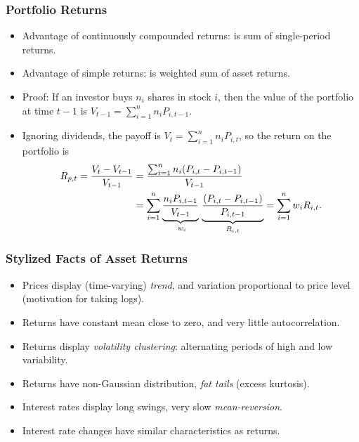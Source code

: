 \begin{frame}
\frametitle{Portfolio Returns}

\begin{itemize}
\item  Advantage of continuously compounded returns: 
is sum of single-period returns.%
\item Advantage of simple returns:  is weighted sum of
asset returns.
\item Proof: If an investor buys $n_{i}$ shares in stock $i$, then the value of the
portfolio at time $t-1$ is $V_{t-1}=\sum_{i=1}^{n}n_{i}P_{i,t-1}$.

\item Ignoring dividends, the payoff is $V_{t}=\sum_{i=1}^{n}n_{i}P_{i,t}$, so the return
on the portfolio is%
\begin{align*}
R_{p,t}=\frac{V_{t}-V_{t-1}}{V_{t-1}} &=\frac{\sum_{i=1}^{n}n_{i}(P_{i,t}-P_{i,t-1})}{V_{t-1}} \\
&=\sum_{i=1}^{n}\underset{w_{i}}{\underbrace{\frac{n_{i}P_{i,t-1}}{%
V_{t-1}}}\ }\underset{R_{i,t}}{\underbrace{\frac{(P_{i,t}-P_{i,t-1})}{P_{i,t-1}}}}
=\sum_{i=1}^{n}w_{i}R_{i,t}.
\end{align*}


\end{itemize}
\end{frame}
\begin{frame}%
\frametitle{Stylized Facts of Asset Returns}

\begin{itemize}
\item Prices display (time-varying) \emph{\color{red}trend}, and variation
proportional to price level (motivation for taking logs).

\item Returns have constant mean close to zero, and very little
autocorrelation.

\item Returns display \emph{\color{red}volatility clustering}: alternating periods of
high and low variability.

\item Returns have non-Gaussian distribution, \emph{\color{red}fat tails} (excess
kurtosis).

\item Interest rates display long swings, very slow \emph{\color{red}mean-reversion}.

\item Interest rate changes have similar characteristics as returns.
\end{itemize}
\end{frame}%
